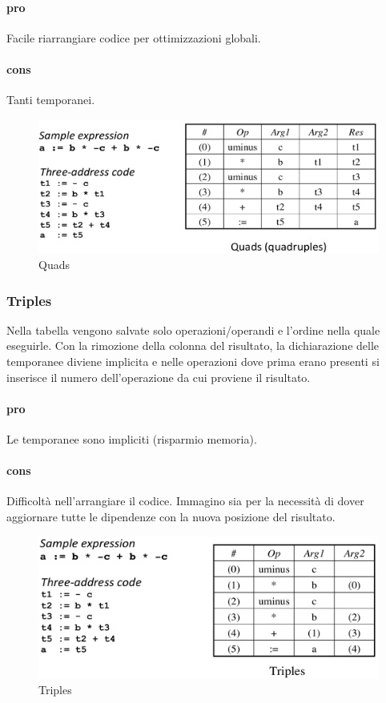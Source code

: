 \paragraph{pro}
Facile riarrangiare codice per ottimizzazioni globali.
\paragraph{cons}
Tanti temporanei.

\begin{figure}[H]
  \centering
  \includegraphics[scale=0.4]{res/image/quads}
  \caption{Quads}
  \label{img:quads}
\end{figure}

\subsubsection{Triples}
\label{sec:triples}
Nella tabella vengono salvate solo operazioni/operandi e l'ordine nella quale
eseguirle. Con la rimozione della colonna del risultato, la dichiarazione
delle temporanee diviene implicita e nelle operazioni dove prima erano presenti
si inserisce il numero dell'operazione da cui proviene il risultato.

\paragraph{pro}
Le temporanee sono impliciti (risparmio memoria).
\paragraph{cons}
Difficolt\`a nell'arrangiare il codice. Immagino sia per la necessit\`a di
dover aggiornare tutte le dipendenze con la nuova posizione del risultato.

\begin{figure}[H]
  \centering
  \includegraphics[scale=0.4]{res/image/triples}
  \caption{Triples}
  \label{img:triples}
\end{figure}

